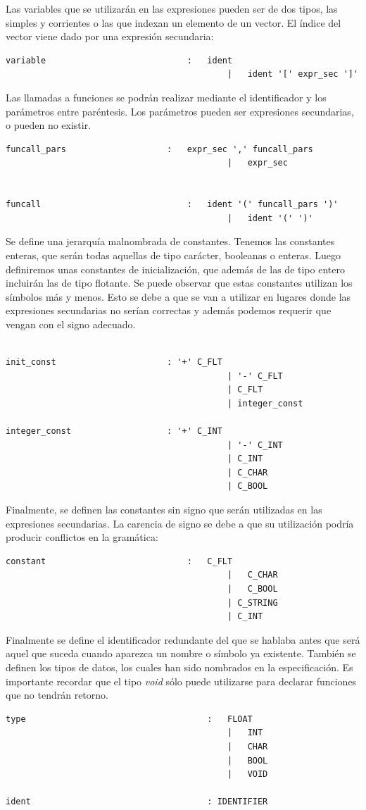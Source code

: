\documentclass[a4paper,10pt]{article}
\begin{document}
Las variables que se utilizarán en las expresiones pueden ser de dos tipos, las simples y corrientes o las que indexan un elemento de un vector. El índice del vector viene dado por una expresión secundaria:
\begin{lstlisting}
variable							:	ident 												
											|	ident '[' expr_sec ']'
\end{lstlisting}

Las llamadas a funciones se podrán realizar mediante el identificador y los parámetros entre paréntesis. Los parámetros pueden ser expresiones secundarias, o pueden no existir.
\begin{lstlisting}
funcall_pars					:	expr_sec ',' funcall_pars
											|	expr_sec  
											
											
funcall								:	ident '(' funcall_pars ')'
											|	ident '(' ')' 
\end{lstlisting}

Se define una jerarquía malnombrada de constantes. Tenemos las constantes enteras, que serán todas aquellas de tipo carácter, booleanas o enteras. Luego definiremos unas constantes de inicialización, que además de las de tipo entero incluirán las de tipo flotante. Se puede observar que estas constantes utilizan los símbolos más y menos. Esto se debe a que se van a utilizar en lugares donde las expresiones secundarias no serían correctas y además podemos requerir que vengan con el signo adecuado.
\begin{lstlisting}

init_const						: '+' C_FLT 
											| '-' C_FLT 
											| C_FLT 
											| integer_const 
											
integer_const					: '+' C_INT 
											| '-' C_INT
											| C_INT
											| C_CHAR 
											| C_BOOL 
\end{lstlisting}

Finalmente, se definen las constantes sin signo que serán utilizadas en las expresiones secundarias. La carencia de signo se debe a que su utilización podría producir conflictos en la gramática:
\begin{lstlisting}
constant							:	C_FLT 
											|	C_CHAR
											|	C_BOOL 
											| C_STRING
											| C_INT 
\end{lstlisting}

Finalmente se define el identificador redundante del que se hablaba antes que será aquel que suceda cuando aparezca un nombre o símbolo ya existente. También se definen los tipos de datos, los cuales han sido nombrados en la especificación. Es importante recordar que el tipo \textit{void} sólo puede utilizarse para declarar funciones que no tendrán retorno.
\begin{lstlisting}
type									:	FLOAT  
											|	INT  
											|	CHAR  
											|	BOOL  
											|	VOID  
											
ident									: IDENTIFIER 
\end{lstlisting}
\end{document}
